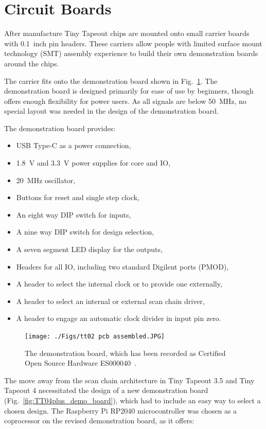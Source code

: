 \section{Circuit Boards}
\label{sec:circuit_board}
After manufacture Tiny Tapeout chips are mounted onto small carrier boards with 0.1~inch pin headers. These carriers allow people with limited surface mount technology (SMT) assembly experience to build their own demonstration boards around the chips.

The carrier fits onto the demonstration board shown in Fig.~\ref{fig:demonstration_board}. The demonstration board is designed primarily for ease of use by beginners, though offers enough flexibility for power users. As all signals are below \qty{50}{\MHz}, no special layout was needed in the design of the demonstration board.

The demonstration board provides:
\begin{itemize}
\item USB Type-C as a power connection,
\item \qty{1.8}{\V} and \qty{3.3}{\V} power supplies for core and IO,
\item \qty{20}{\MHz} oscillator,
\item Buttons for reset and single step clock,
\item An eight way DIP switch for inputs,
\item A nine way DIP switch for design selection,
\item A seven segment LED display for the outputs,
\item Headers for all IO, including two standard Digilent ports (PMOD),
\item A header to select the internal clock or to provide one externally,
\item A header to select an internal or external scan chain driver,
\item A header to engage an automatic clock divider in input pin zero.
\end{itemize}

\begin{figure}[!t]
\centering
\texttt{[image: ./Figs/tt02 pcb assembled.JPG]}
\caption{The demonstration board, which has been recorded as Certified Open Source Hardware ES000040~\cite{oshwacertification}.}
\label{fig:demonstration_board}
\end{figure}

The move away from the scan chain architecture in Tiny Tapeout 3.5 and Tiny Tapeout 4 necessitated the design of a new demonstration board (Fig.~\ref{fig:TT04plus_demo_board}), which had to include an easy way to select a chosen design.
The Raspberry Pi RP2040 microcontroller was chosen as a coprocessor on the revised demonstration board, as it offers:

